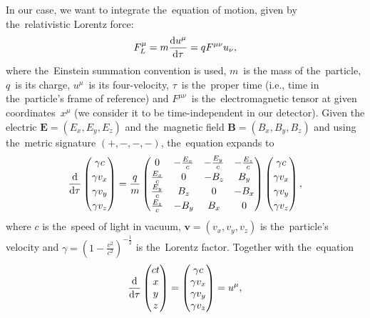 		In our case, we want to integrate the~equation of motion, given by the~relativistic Lorentz force:
			\begin{equation}
				F^\mu_L = m\derivative{u^\mu}{\tau} = q F^{\mu\nu}u_{\nu},
			\end{equation}
		where the~Einstein summation convention is used, $m$~is the mass of the~particle, $q$~is its charge, $u^\mu$~is its four-velocity, $\tau$~is the~proper time (i.e., time in the~particle's frame of reference) and $F^{\mu\nu}$~is the~electromagnetic tensor at given coordinates~$x^\mu$ (we consider it to be time-independent in our detector). Given the electric $\mathbf{E} = (E_x,E_y,E_z)$ and the~magnetic field $\mathbf{B} = (B_x,B_y,B_z)$ and using the~metric signature $(+,-,-,-)$, the~equation expands to
			\begin{equation}
				\renewcommand{\arraystretch}{1.2}
				\derivative{}{\tau} \begin{pmatrix}\gamma c\\ \gamma v_x\\ \gamma v_y\\ \gamma v_z\end{pmatrix} = \frac{q}{m} 
				\begin{pmatrix}
					0             & -\frac{E_x}{c} & -\frac{E_y}{c} & -\frac{E_z}{c} \\
					\frac{E_x}{c} &  0             & -B_z           &  B_y           \\
					\frac{E_y}{c} &  B_z           &  0             & -B_x           \\
					\frac{E_z}{c} & -B_y           &  B_x           &  0
				\end{pmatrix}
				\begin{pmatrix}\gamma c\\ \gamma v_x\\ \gamma v_y\\ \gamma v_z\end{pmatrix},
				\renewcommand{\arraystretch}{1}
			\end{equation}
		where $c$ is the~speed of light in vacuum, $\mathbf{v} = (v_x,v_y,v_z)$ is the~particle's velocity and $\gamma = \left(1-\frac{v^2}{c^2}\right)^{-\frac{1}{2}}$ is the~Lorentz factor. Together with the~equation
			\begin{equation}
				\derivative{}{\tau} \begin{pmatrix} ct\\ x\\ y\\ z\end{pmatrix} = \begin{pmatrix}\gamma c\\ \gamma v_x\\ \gamma v_y\\ \gamma v_z\end{pmatrix} = u^\mu,
			\end{equation}
